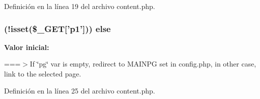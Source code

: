 Definición en la línea 19 del archivo content.\-php.

\hypertarget{vdl-include_2content_8php_a93ead46cf0a367ef399d1c95bf036067}{
\subsubsection[{else}]{ (!isset(\$\-\_\-\-G\-E\-T\mbox{[}'p1'\mbox{]})) else}}\label{vdl-include_2content_8php_a93ead46cf0a367ef399d1c95bf036067}
{\bfseries Valor inicial\-:}


===$>$If \char`\"{}pg\char`\"{} var is empty, redirect to M\-A\-I\-N\-P\-G set in config.\-php, in other case, link to the selected page. 



Definición en la línea 25 del archivo content.\-php.

